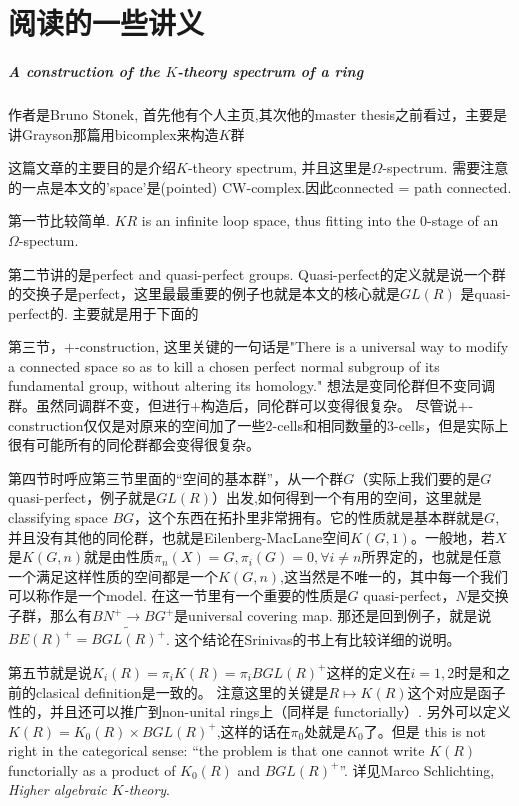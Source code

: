 \chapter{阅读的一些讲义} %
\label{cha:readnotes}
\paragraph{A construction of the $K$-theory spectrum of a ring} %
\label{par:a_construction_of_the_}
作者是Bruno Stonek, 首先他有个人主页\href{bruno.stonek.com},其次他的master thesis之前看过，主要是讲Grayson那篇用bicomplex来构造$K$群

这篇文章的主要目的是介绍$K$-theory spectrum, 并且这里是$\Omega$-spectrum. 需要注意的一点是本文的'space'是(pointed) CW-complex.因此connected = path connected.

第一节比较简单. $KR$ is an infinite loop space, thus fitting into the $0$-stage of an $\Omega$-spectum.

第二节讲的是perfect and quasi-perfect groups. Quasi-perfect的定义就是说一个群的交换子是perfect，这里最最重要的例子也就是本文的核心就是$GL(R)$ 是quasi-perfect的. 主要就是用于下面的

第三节，$+$-construction, 这里关键的一句话是"There is a universal way to {\color{red}modify} a connected space so as to kill a chosen perfect normal subgroup of its fundamental group, without altering its homology." 想法是变同伦群但不变同调群。虽然同调群不变，但进行$+$构造后，同伦群可以变得很复杂。 尽管说$+$-construction仅仅是对原来的空间加了一些$2$-cells和相同数量的$3$-cells，但是实际上很有可能所有的同伦群都会变得很复杂。

第四节时呼应第三节里面的“空间的基本群”，从一个群$G$（实际上我们要的是$G$ quasi-perfect，例子就是$GL(R)$）出发,如何得到一个有用的空间，这里就是classifying space $BG$，这个东西在拓扑里非常拥有。它的性质就是基本群就是$G$,并且没有其他的同伦群，也就是Eilenberg-MacLane空间$K(G,1)$。一般地，若$X$是$K(G,n)$就是由性质$\pi_n(X)=G,\pi_i(G)=0, \forall i\neq n$所界定的，也就是任意一个满足这样性质的空间都是一个$K(G,n)$,这当然是不唯一的，其中每一个我们可以称作是一个model. 在这一节里有一个重要的性质是$G$ quasi-perfect，$N$是交换子群，那么有$BN^+ \longrightarrow BG^+$是universal covering map. 那还是回到例子，就是说$BE(R)^+=\widetilde{BGL(R)^+}$. 这个结论在Srinivas的书上有比较详细的说明。

第五节就是说$K_i(R)=\pi_i K(R)=\pi_i BGL(R)^+$这样的定义在$i=1,2$时是和之前的clasical definition是一致的。
注意这里的关键是$R\mapsto K(R)$这个对应是函子性的，并且还可以推广到non-unital rings上（同样是 functorially）.
另外可以定义$K(R)=K_0(R)\times BGL(R)^+$,这样的话在$\pi_0$处就是$K_0$了。但是 this is not right in the categorical sense: ``the problem is that one cannot write $K(R)$ functorially as a product of $K_0(R)$ and $BGL	(R)^+$''. 详见Marco Schlichting, {\em Higher algebraic $K$-theory}.


